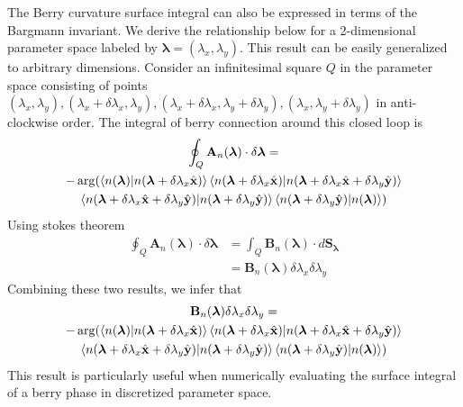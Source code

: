 The Berry curvature surface integral can also be expressed in terms of the Bargmann invariant. We derive the relationship below for a 2-dimensional parameter space
labeled by $\bm{\lambda} = (\lambda_x, \lambda_y)$. This result can be easily generalized to arbitrary dimensions. Consider an infinitesimal square $Q$ in the parameter space 
consisting of points $(\lambda_x, \lambda_y), (\lambda_x + \delta\lambda_x, \lambda_y), (\lambda_x + \delta\lambda_x, \lambda_y + \delta\lambda_y), (\lambda_x, \lambda_y+\delta\lambda_y)$
in anti-clockwise order. The integral of berry connection around this closed loop is
\begin{multline*}
  \oint_{Q}{\mathbf{A}_{n}(\bm{\lambda})\cdot \delta\bm{\lambda}} = \\
  -\arg(\braket{n(\bm{\lambda})|n(\bm{\lambda} + \delta\lambda_x \hat{\mathbf{x}})}\braket{n(\bm{\lambda} + \delta\lambda_x \hat{\mathbf{x}})|n(\bm{\lambda} + \delta\lambda_x \hat{\mathbf{x}} + \delta\lambda_y \hat{\mathbf{y}})}\\ \braket{n(\bm{\lambda} + \delta\lambda_x \hat{\mathbf{x}} + \delta\lambda_y \hat{\mathbf{y}})|n(\bm{\lambda} + \delta\lambda_y \hat{\mathbf{y}})}\braket{n(\bm{\lambda} + \delta\lambda_y \hat{\mathbf{y}})|n(\bm{\lambda})})
\end{multline*}
Using stokes theorem
\begin{align*}
  \oint_{Q}{\mathbf{A}_{n}(\bm{\lambda})\cdot \delta\bm{\lambda}} &= \int_{Q}{\mathbf{B}_{n}(\bm{\lambda})\cdot d\mathbf{S}_{\bm{\lambda}}}\\
  &= \mathbf{B}_{n}(\bm{\lambda}) \delta\lambda_x\delta\lambda_y
\end{align*}
Combining these two results, we infer that
\begin{multline}
 \mathbf{B}_{n}(\bm{\lambda}) \delta\lambda_x\delta\lambda_y = \\
 -\arg(\braket{n(\bm{\lambda})|n(\bm{\lambda} + \delta\lambda_x \hat{\mathbf{x}})}\braket{n(\bm{\lambda} + \delta\lambda_x \hat{\mathbf{x}})|n(\bm{\lambda} + \delta\lambda_x \hat{\mathbf{x}} + \delta\lambda_y \hat{\mathbf{y}})}\\ \braket{n(\bm{\lambda} + \delta\lambda_x \hat{\mathbf{x}} + \delta\lambda_y \hat{\mathbf{y}})|n(\bm{\lambda} + \delta\lambda_y \hat{\mathbf{y}})}\braket{n(\bm{\lambda} + \delta\lambda_y \hat{\mathbf{y}})|n(\bm{\lambda})})
\end{multline}
This result is particularly useful when numerically evaluating the surface integral of a berry phase in discretized parameter space.

